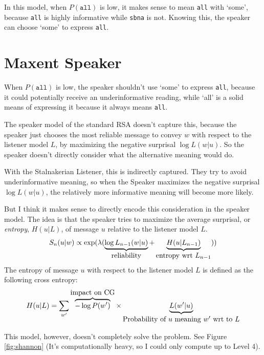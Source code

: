 \documentclass[12pt, a4paper, usenames, dvipsnames]{article}
\begin{document}
In this model, when \(P(\texttt{all})\) is low, it makes sense to mean \texttt{all} with `some', because \texttt{all} is highly informative while \texttt{sbna} is not. Knowing this, the speaker can choose `some' to express \texttt{all}.


\section{Maxent Speaker}

When \(P(\texttt{all})\) is low, the speaker shouldn't use `some' to express \texttt{all}, because it could potentially receive an underinformative reading, while `all' is a solid means of expressing it because it always means \texttt{all}.

The speaker model of the standard RSA doesn't capture this, because the speaker just chooses the most reliable message to convey $w$ with respect to the listener model $L$, by maximizing the negative surprisal $\log L(w|u)$. So the speaker doesn't directly consider what the alternative meaning would do.

With the Stalnakerian Listener, this is indirectly captured. They try to avoid underinformative meaning, so when the Speaker maximizes the negative surprisal $\log L(w|u)$, the relatively more informative meaning will become more likely.

But I think it makes sense to directly encode this consideration in the speaker model. The idea is that the speaker tries to maximize the average surprisal, or \emph{entropy}, $H(u|L)$, of message $u$ relative to the listener model $L$.
\[
S_n(u|w) \propto \exp(\lambda (\underbrace{\log L_{n-1}(w|u)}_{\text{\normalsize reliability}} + \underbrace{H(u|L_{n-1})}_{\text{\normalsize entropy wrt $L_{n-1}$}}))
\]
The entropy of message $u$ with respect to the listener model $L$ is defined as the following cross entropy:
\[
H(u|L) = \sum_{w'} \overbrace{-\log P(w')}^{\text{\normalsize impact on CG}}\times \underbrace{L(w'|u)}_{\text{\normalsize Probability of $u$ meaning $w'$ wrt to $L$}}
\]


This model, however, doesn't completely solve the problem. See Figure \ref{fig:shannon} (It's computationally heavy, so I could only compute up to Level 4).
\end{document}

